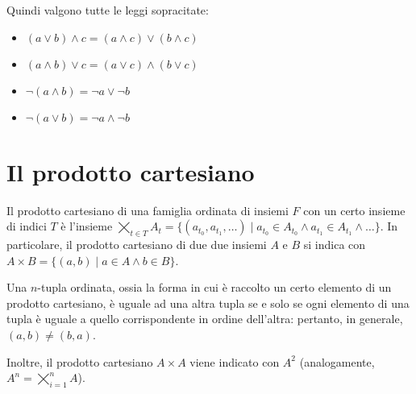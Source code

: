 Quindi valgono tutte le leggi sopracitate:

\begin{itemize}
    \item $(a \lor b) \land c = (a \land c) \lor (b \land c)$
    \item $(a \land b) \lor c = (a \lor c) \land (b \lor c)$
    \item $\lnot (a \land b) = \lnot a \lor \lnot b$
    \item $\lnot (a \lor b) = \lnot a \land \lnot b$
\end{itemize}

\section{Il prodotto cartesiano}

Il prodotto cartesiano di una famiglia ordinata di insiemi $F$ con un certo insieme
di indici $T$ è l'insieme
$\bigtimes_{t \in T} A_t = \{(a_{t_0}, a_{t_1}, \ldots) \mid a_{t_0} \in A_{t_0} \land
    a_{t_1} \in A_{t_1} \land \ldots\}$. In particolare, il prodotto cartesiano di
due due insiemi $A$ e $B$ si indica con $A \times B = \{(a, b) \mid a \in A \land b \in B\}$.

Una $n$-tupla ordinata, ossia la forma in cui è raccolto un certo elemento di un prodotto cartesiano,
è uguale ad una altra tupla se e solo se ogni elemento di una tupla è uguale a quello
corrispondente in ordine dell'altra: pertanto, in generale, $(a, b) \neq (b, a)$.

Inoltre, il prodotto cartesiano $A \times A$ viene indicato con $A^2$ (analogamente,
$A^n = \bigtimes_{i=1}^{n} A$).